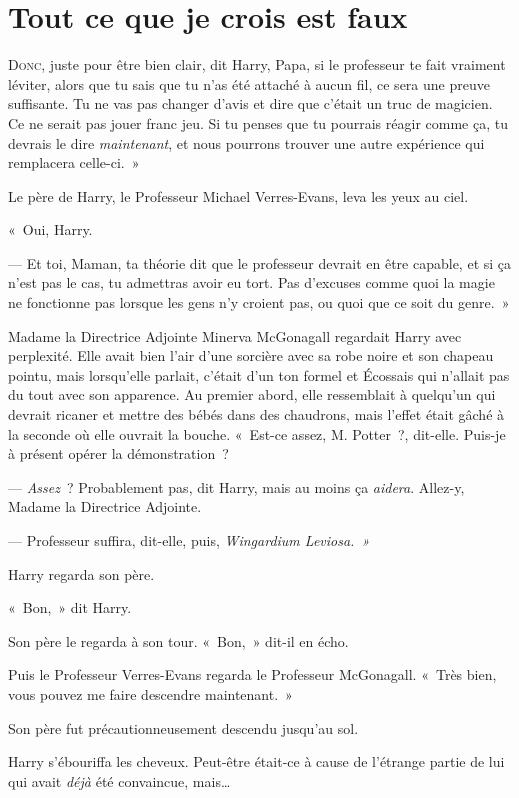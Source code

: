 \chapter{Tout ce que je crois est faux}

\lettrine[ante=«~]{D}{onc}, juste pour être bien clair, dit Harry, Papa, si le professeur te fait vraiment léviter, alors que tu sais que tu n'as été attaché à aucun fil, ce sera une preuve suffisante. Tu ne vas pas changer d'avis et dire que c'était un truc de magicien. Ce ne serait pas jouer franc jeu. Si tu penses que tu pourrais réagir comme ça, tu devrais le dire \emph{maintenant}, et nous pourrons trouver une autre expérience qui remplacera celle-ci.~»

Le père de Harry, le Professeur Michael Verres-Evans, leva les yeux au ciel.

«~Oui, Harry.

--- Et toi, Maman, ta théorie dit que le professeur devrait en être capable, et si ça n'est pas le cas, tu admettras avoir eu tort. Pas d'excuses comme quoi la magie ne fonctionne pas lorsque les gens n'y croient pas, ou quoi que ce soit du genre.~»

Madame la Directrice Adjointe Minerva McGonagall regardait Harry avec perplexité. Elle avait bien l'air d'une sorcière avec sa robe noire et son chapeau pointu, mais lorsqu'elle parlait, c'était d'un ton formel et Écossais qui n'allait pas du tout avec son apparence. Au premier abord, elle ressemblait à quelqu'un qui devrait ricaner et mettre des bébés dans des chaudrons, mais l'effet était gâché à la seconde où elle ouvrait la bouche. «~Est-ce assez, M. Potter~?, dit-elle. Puis-je à présent opérer la démonstration~?

--- \emph{Assez}~? Probablement pas, dit Harry, mais au moins ça \emph{aidera}. Allez-y, Madame la Directrice Adjointe.

--- Professeur suffira, dit-elle, puis, \emph{Wingardium Leviosa.~»}

Harry regarda son père.

«~Bon,~» dit Harry.

Son père le regarda à son tour. «~Bon,~» dit-il en écho.

Puis le Professeur Verres-Evans regarda le Professeur McGonagall. «~Très bien, vous pouvez me faire descendre maintenant.~»

Son père fut précautionneusement descendu jusqu'au sol.

Harry s'ébouriffa les cheveux. Peut-être était-ce à cause de l'étrange partie de lui qui avait \emph{déjà} été convaincue, mais…

